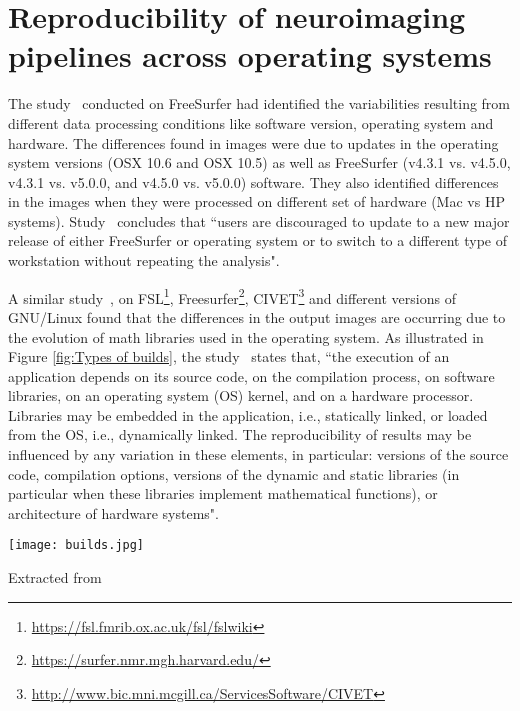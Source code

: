 \section{Reproducibility of neuroimaging pipelines across operating systems}\label{reproducibility_neuroimaging}

The study~\cite{10.1371/journal.pone.0038234} conducted on FreeSurfer had identified the variabilities resulting from different data processing conditions like software version, operating system and hardware. The differences found in images were due to updates in the operating system versions (OSX 10.6 and OSX 10.5) as well as FreeSurfer (v4.3.1 vs. v4.5.0, v4.3.1 vs. v5.0.0, and v4.5.0 vs. v5.0.0) software. They also identified differences in the images when they were processed on different set of hardware (Mac vs HP systems). Study~\cite{10.1371/journal.pone.0038234} concludes that ``users are discouraged to update to a new major release of either FreeSurfer or operating system or to switch to a different type of workstation without repeating the analysis".

A similar study~\cite{Gla15}, on FSL\footnote{\url{https://fsl.fmrib.ox.ac.uk/fsl/fslwiki}}, Freesurfer\footnote{\url{https://surfer.nmr.mgh.harvard.edu/}}, CIVET\footnote{\url{http://www.bic.mni.mcgill.ca/ServicesSoftware/CIVET}} and different versions of GNU/Linux found that the differences in the output images are occurring due to the evolution of math libraries used in the operating system. As illustrated in Figure \ref{fig:Types of builds}, the study~\cite{Gla15} states that, ``the execution of an application depends on its source code, on the compilation process, on software libraries, on an operating system (OS) kernel, and on a hardware processor. Libraries may be embedded in the application, i.e., statically linked, or loaded from the OS, i.e., dynamically linked. The reproducibility of results may be influenced by any variation in these elements, in particular: versions of the source code, compilation options, versions of the dynamic and static libraries (in particular when these libraries implement mathematical functions), or architecture of hardware systems".

\begin{center}
\texttt{[image: builds.jpg]}
\label{fig:Types of builds}
\caption*{Extracted from \cite{Gla15}}
\end{center}

